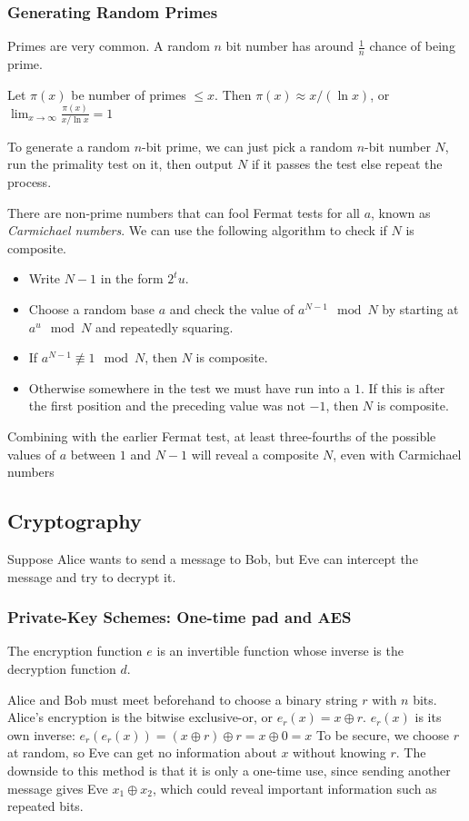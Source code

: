 \subsubsection{Generating Random Primes}
Primes are very common.
A random $n$ bit number has around $\frac{1}{n}$ chance of being prime.
\begin{thm}
  Let $\pi(x)$ be number of primes $\leq x$.
  Then $\pi(x) \approx x/(\ln x)$, or $\lim_{x \rightarrow \infty} \frac{\pi(x)}{x/ \ln x} = 1$
\end{thm}
To generate a random $n$-bit prime, we can just pick a random $n$-bit number $N$, run the primality test on it, then output $N$ if it passes the test else repeat the process.
\begin{definition}
There are non-prime numbers that can fool Fermat tests for all $a$, known as \emph{Carmichael numbers}. We can use the following algorithm to check if $N$ is composite.
\begin{itemize}
  \item Write $N-1$ in the form $2^tu$.
  \item Choose a random base $a$ and check the value of $a^{N-1} \mod N$ by starting at $a^u \mod N$ and repeatedly squaring.
  \item If $a^{N-1} \not\equiv 1 \mod N$, then $N$ is composite.
  \item Otherwise somewhere in the test we must have run into a $1$. If this is after the first position and the preceding value was not $-1$, then $N$ is composite.
\end{itemize}
\end{definition}
Combining with the earlier Fermat test, at least three-fourths of the possible values of $a$ between $1$ and $N-1$ will reveal a composite $N$, even with Carmichael numbers

\subsection{Cryptography}
Suppose Alice wants to send a message to Bob, but Eve can intercept the message and try to decrypt it.

\subsubsection{Private-Key Schemes: One-time pad and AES}
The encryption function $e$ is an invertible function whose inverse is the decryption function $d$.
\begin{definition}
  Alice and Bob must meet beforehand to choose a binary string $r$ with $n$ bits.
  Alice's encryption is the bitwise exclusive-or, or $e_r(x) = x \oplus r$.
  $e_r(x)$ is its own inverse: $e_r(e_r(x)) = (x \oplus r) \oplus r = x \oplus 0 = x$
  To be secure, we choose $r$ at random, so Eve can get no information about $x$ without knowing $r$.
  The downside to this method is that it is only a one-time use, since sending another message gives Eve $x_1 \oplus x_2$, which could reveal important information such as repeated bits.
\end{definition}

